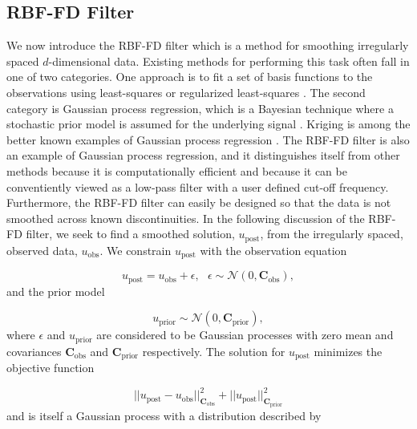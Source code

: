 \documentclass[10pt,a4paper]{article}
\begin{document}
\subsection{RBF-FD Filter}\label{sec:Filter}
We now introduce the RBF-FD filter which is a method for smoothing irregularly spaced $d$-dimensional data.  Existing methods for performing this task often fall in one of two categories.  One approach is to fit a set of basis functions to the observations using least-squares or regularized least-squares \citep[e.g.][]{Fasshauer2007}.  The second category is Gaussian process regression, which is a Bayesian technique where a stochastic prior model is assumed for the underlying signal \citep[e.g.][]{Rasmussen2006}.  Kriging is among the better known examples of Gaussian process regression \citep{Matheron1963}.  The RBF-FD filter is also an example of Gaussian process regression, and it distinguishes itself from other methods because it is computationally efficient and because it can be conventiently viewed as a low-pass filter with a user defined cut-off frequency. Furthermore, the RBF-FD filter can easily be designed so that the data is not smoothed across known discontinuities. In the following discussion of the RBF-FD filter, we seek to find a smoothed solution, $u_\mathrm{post}$, from the irregularly spaced, observed data, $u_\mathrm{obs}$. We constrain $u_\mathrm{post}$ with the observation equation

\begin{equation}\label{eq:Data}
  u_\mathrm{post} = u_\mathrm{obs} + \epsilon,\ \ \ \epsilon \sim \mathcal{N}(0,\mathbf{C}_\mathrm{obs}),
\end{equation}
and the prior model

\begin{equation}\label{eq:Prior}
  u_\mathrm{prior} \sim \mathcal{N}(0,\mathbf{C}_\mathrm{prior}),
\end{equation}
where $\epsilon$ and $u_\mathrm{prior}$ are considered to be Gaussian processes with zero mean and covariances $\mathbf{C}_\mathrm{obs}$ and $\mathbf{C}_\mathrm{prior}$ respectively.  The solution for $u_\mathrm{post}$ minimizes the objective function  

\begin{equation}\label{eq:Objective}
||u_\mathrm{post} - u_\mathrm{obs}||_{\mathbf{C}_\mathrm{obs}}^2 + 
||u_\mathrm{post}||_{\mathbf{C}_\mathrm{prior}}^2
\end{equation}
and is itself a Gaussian process with a distribution described by
\end{document}
